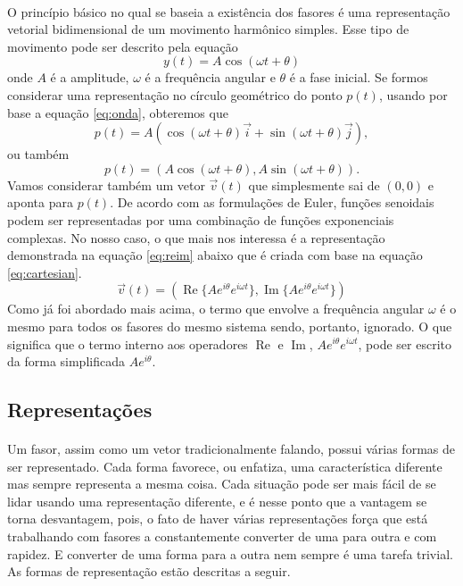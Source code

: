 \documentclass[conference,harvard, brazil]{sbatex}
\begin{document}
	\paragraph{}O princípio básico no qual se baseia a existência dos fasores é uma representação vetorial bidimensional de um movimento harmônico simples. Esse tipo de movimento pode ser descrito pela equação
	\begin{equation}
		y(t) = A\cos(\omega t+\theta)
		\label{eq:onda}
	\end{equation}
	onde $A$ é a amplitude, $\omega$ é a frequência angular e $\theta$ é a fase inicial. Se formos considerar uma representação no círculo geométrico do ponto $p(t)$, usando por base a equação \ref{eq:onda}, obteremos que
	\begin{equation*}
		p(t) = A(\cos(\omega t+\theta)\overrightarrow{i}+\sin(\omega t+\theta)\overrightarrow{j}),
	\end{equation*}
	ou também
	\begin{equation}
		p(t) = (A\cos(\omega t+\theta), A\sin(\omega t+\theta)).
		\label{eq:cartesian}
	\end{equation}
	Vamos considerar também um vetor $\overrightarrow{v}(t)$ que simplesmente sai de $(0, 0)$ e aponta para $p(t)$. De acordo com as formulações de Euler, funções senoidais podem ser representadas por uma combinação de funções exponenciais complexas. No nosso caso, o que mais nos interessa é a representação demonstrada na equação \ref{eq:reim} abaixo que é criada com base na equação \ref{eq:cartesian}.
	\begin{equation}
		\overrightarrow{v}(t) = (\operatorname{Re}\{A e^{i\theta}e^{i\omega t}\}, \operatorname{Im}\{A e^{i\theta}e^{i\omega t}\})
		\label{eq:reim}
	\end{equation}
	Como já foi abordado mais acima, o termo que envolve a frequência angular $\omega$ é o mesmo para todos os fasores do mesmo sistema sendo, portanto, ignorado. O que significa que o termo interno aos operadores $\operatorname{Re}$ e $\operatorname{Im}$, $Ae^{i\theta}e^{i\omega t}$, pode ser escrito da forma simplificada $Ae^{i\theta}$.
	
	\subsection{Representações}
	\paragraph{}Um fasor, assim como um vetor tradicionalmente falando, possui várias formas de ser representado. Cada forma favorece, ou enfatiza, uma característica diferente mas sempre representa a mesma coisa. Cada situação pode ser mais fácil de se lidar usando uma representação diferente, e é nesse ponto que a vantagem se torna desvantagem, pois, o fato de haver várias representações força que está trabalhando com fasores a constantemente converter de uma para outra e com rapidez. E converter de uma forma para a outra nem sempre é uma tarefa trivial. As formas de representação estão descritas a seguir.
	
\end{document}
